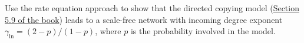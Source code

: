 \documentclass[assignment = 9]{homework}
\begin{document}
    \pagestyle{main}

    Use the rate equation approach to show that the directed copying model (\href{http://networksciencebook.com/chapter/5#origins}{Section 5.9 of the book}) leads to a scale-free network with incoming degree exponent $\gamma_{\text{in}} = (2-p)/(1-p)$, where $p$ is the probability involved in the model.

    
    
\end{document}
